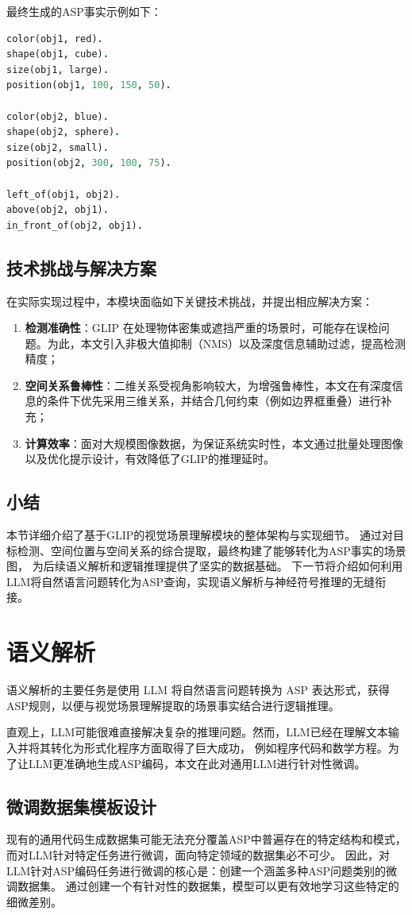 最终生成的ASP事实示例如下： 
\begin{lstlisting}[language=Prolog] 
color(obj1, red). 
shape(obj1, cube). 
size(obj1, large). 
position(obj1, 100, 150, 50).

color(obj2, blue). 
shape(obj2, sphere). 
size(obj2, small). 
position(obj2, 300, 100, 75).

left_of(obj1, obj2). 
above(obj2, obj1). 
in_front_of(obj2, obj1). 
\end{lstlisting}
\subsection{技术挑战与解决方案}
在实际实现过程中，本模块面临如下关键技术挑战，并提出相应解决方案： 
\begin{enumerate}[label=(\arabic*),itemsep=0.5em] 
    \item \textbf{检测准确性}：GLIP 在处理物体密集或遮挡严重的场景时，可能存在误检问题。为此，本文引入非极大值抑制（NMS）以及深度信息辅助过滤，提高检测精度； 
    \item \textbf{空间关系鲁棒性}：二维关系受视角影响较大，为增强鲁棒性，本文在有深度信息的条件下优先采用三维关系，并结合几何约束（例如边界框重叠）进行补充； 
    \item \textbf{计算效率}：面对大规模图像数据，为保证系统实时性，本文通过批量处理图像以及优化提示设计，有效降低了GLIP的推理延时。
\end{enumerate}
\subsection{小结}
本节详细介绍了基于GLIP的视觉场景理解模块的整体架构与实现细节。
通过对目标检测、空间位置与空间关系的综合提取，最终构建了能够转化为ASP事实的场景图，
为后续语义解析和逻辑推理提供了坚实的数据基础。
下一节将介绍如何利用LLM将自然语言问题转化为ASP查询，实现语义解析与神经符号推理的无缝衔接。
\section{语义解析}
语义解析的主要任务是使用 LLM 将自然语言问题转换为 ASP 表达形式，获得ASP规则，以便与视觉场景理解提取的场景事实结合进行逻辑推理。

直观上，LLM可能很难直接解决复杂的推理问题。然而，LLM已经在理解文本输入并将其转化为形式化程序方面取得了巨大成功，
例如程序代码\cite{gao2023pal}和数学方程\cite{he2023solving}。为了让LLM更准确地生成ASP编码，本文在此对通用LLM进行针对性微调。
\subsection{微调数据集模板设计}
现有的通用代码生成数据集可能无法充分覆盖ASP中普遍存在的特定结构和模式，而对LLM针对特定任务进行微调，面向特定领域的数据集必不可少。
因此，对LLM针对ASP编码任务进行微调的核心是：创建一个涵盖多种ASP问题类别的微调数据集。
通过创建一个有针对性的数据集，模型可以更有效地学习这些特定的细微差别。

